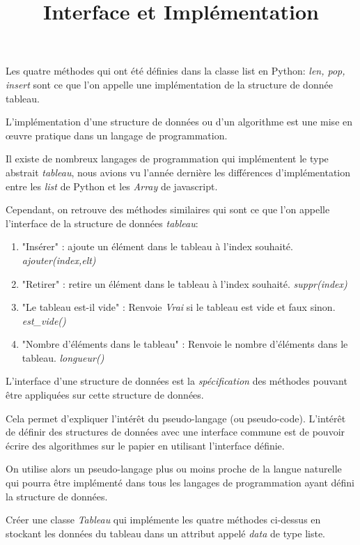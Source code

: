 \documentclass[12pt,fleqn]{article} %
\begin{document}
\title{Interface et Implémentation}
\maketitle


Les quatre méthodes qui ont été définies dans la classe list en Python: \textit{len, pop, insert} sont ce que l'on appelle une implémentation de la structure de donnée tableau.



\begin{definition}
	L'implémentation d'une structure de données ou d'un algorithme est une mise en œuvre pratique dans un langage de programmation.
\end{definition}


Il existe de nombreux langages de programmation qui implémentent le type abstrait \textit{tableau}, nous avions vu l'année dernière les différences d'implémentation entre les \textit{list} de Python et les \textit{Array} de javascript.

Cependant, on retrouve des méthodes similaires qui sont ce que l'on appelle l'interface de la structure de données \textit{tableau}:

\begin{enumerate}
	\item "Insérer" : ajoute un élément dans le tableau à l'index souhaité. \textit{ajouter(index,elt)}
		\item "Retirer" : retire un élément dans le tableau à l'index souhaité. \textit{suppr(index)}
	\item "Le tableau est-il vide" : Renvoie \textit{Vrai} si le tableau est vide et faux sinon. \textit{est\_vide()}
	\item "Nombre d'éléments dans le tableau" : Renvoie le nombre d'éléments dans le tableau. \textit{longueur()}
	
\end{enumerate}



\begin{definition}
	L'interface d'une structure de données est la \textit{spécification} des méthodes pouvant être appliquées sur cette structure de données.
\end{definition}

Cela permet d'expliquer l'intérêt du pseudo-langage (ou pseudo-code). L'intérêt de définir des structures de données avec une interface commune est de pouvoir écrire des algorithmes sur le papier en utilisant l'interface définie.

On utilise alors un pseudo-langage plus ou moins proche de la langue naturelle qui pourra être implémenté dans tous les langages de programmation ayant défini la structure de données.

\begin{exercise}
	Créer une classe \textit{Tableau} qui implémente les quatre méthodes ci-dessus en stockant les données du tableau dans un attribut appelé \textit{data} de type liste.
\end{exercise}
\end{document}
